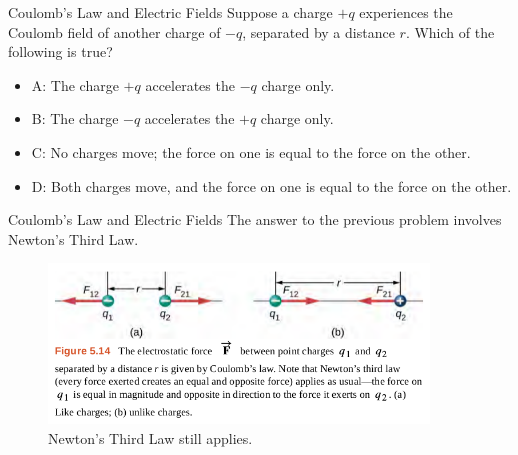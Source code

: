 \documentclass{beamer}
\begin{document}
\begin{frame}{Coulomb’s Law and Electric Fields}
Suppose a charge $+q$ experiences the Coulomb field of another charge of $-q$, separated by a distance $r$.  Which of the following is true?
\begin{itemize}
\item A: The charge $+q$ accelerates the $-q$ charge only.
\item B: The charge $-q$ accelerates the $+q$ charge only.
\item C: No charges move; the force on one is equal to the force on the other.
\item D: Both charges move, and the force on one is equal to the force on the other.
\end{itemize}
\end{frame}

\begin{frame}{Coulomb’s Law and Electric Fields}
The answer to the previous problem involves Newton's Third Law.
\begin{figure}
\centering
\includegraphics[width=0.9\textwidth]{figures/third.png}
\caption{\label{fig:third} Newton's Third Law still applies.}
\end{figure}
\end{frame}
\end{document}
